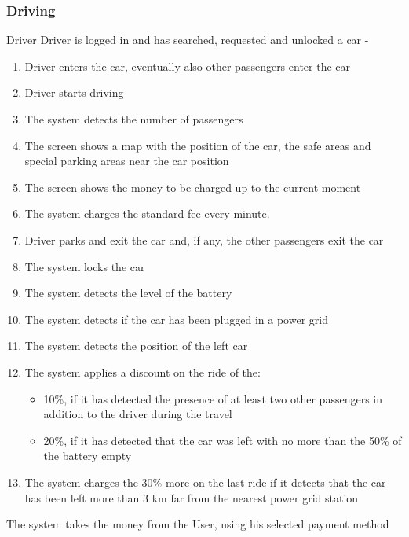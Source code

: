 \subsubsection{Driving}
{Driver}
{ \newline {} \newline {} \newline {}}
{Driver is logged in and has searched, requested and unlocked a car}
{-}
{
\begin{enumerate}
\item Driver enters the car, eventually also other passengers enter the car
\item Driver starts driving
\item The system detects the number of passengers
\item The screen shows a map with the position of the car, the safe areas and special parking areas near the car position
\item The screen shows the money to be charged up to the current moment
\item The system charges the standard fee every minute.
\item Driver parks and exit the car and, if any, the other passengers exit the car
\item The system locks the car
\item The system detects the level of the battery
\item The system detects if the car has been plugged in a power grid
\item The system detects the position of the left car
\item The system applies a discount on the ride of the:
	\begin{itemize}
	\item 10\%, if it has detected the presence of at least two other passengers in addition to the driver during the travel
	\item 20\%, if it has detected that the car was left with no more than the 50\% of the battery empty
	
	\end{itemize}
\item The system charges the 30\% more on the last ride if it detects that the car has been left more than 3 km far
	from the nearest power grid station
	\end{enumerate}
\item The system takes the money from the User, using his selected payment method
}
